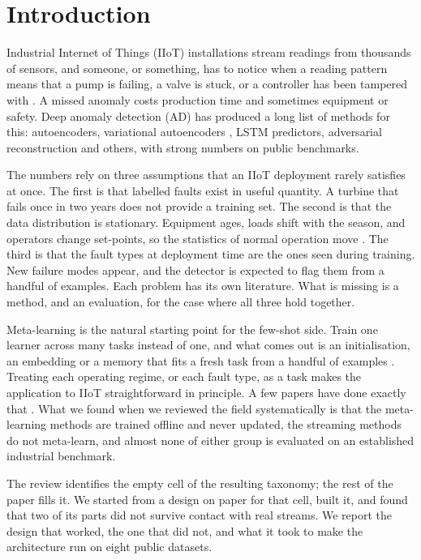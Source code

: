\hypertarget{introduction}{%
\section{Introduction}\label{introduction}}

Industrial Internet of Things (IIoT) installations stream readings from thousands of sensors, and someone, or something, has to notice when a reading pattern means that a pump is failing, a valve is stuck, or a controller has been tampered with \citep{chandola2009survey, pang2021deep}. A missed anomaly costs production time and sometimes equipment or safety. Deep anomaly detection (AD) has produced a long list of methods for this: autoencoders, variational autoencoders \citep{kingma2014vae}, LSTM predictors, adversarial reconstruction \citep{audibert2020usad} and others, with strong numbers on public benchmarks.

The numbers rely on three assumptions that an IIoT deployment rarely satisfies at once. The first is that labelled faults exist in useful quantity. A turbine that fails once in two years does not provide a training set. The second is that the data distribution is stationary. Equipment ages, loads shift with the season, and operators change set-points, so the statistics of normal operation move \citep{gama2014drift, lu2019drift}. The third is that the fault types at deployment time are the ones seen during training. New failure modes appear, and the detector is expected to flag them from a handful of examples. Each problem has its own literature. What is missing is a method, and an evaluation, for the case where all three hold together.

Meta-learning is the natural starting point for the few-shot side. Train one learner across many tasks instead of one, and what comes out is an initialisation, an embedding or a memory that fits a fresh task from a handful of examples \citep{finn2017maml, snell2017proto, hospedales2022meta}. Treating each operating regime, or each fault type, as a task makes the application to IIoT straightforward in principle. A few papers have done exactly that \citep{moon2023mavae, feng2024metauad, tian2024omlog}. What we found when we reviewed the field systematically is that the meta-learning methods are trained offline and never updated, the streaming methods do not meta-learn, and almost none of either group is evaluated on an established industrial benchmark.

The review identifies the empty cell of the resulting taxonomy; the rest of the paper fills it. We started from a design on paper for that cell, built it, and found that two of its parts did not survive contact with real streams. We report the design that worked, the one that did not, and what it took to make the architecture run on eight public datasets.

